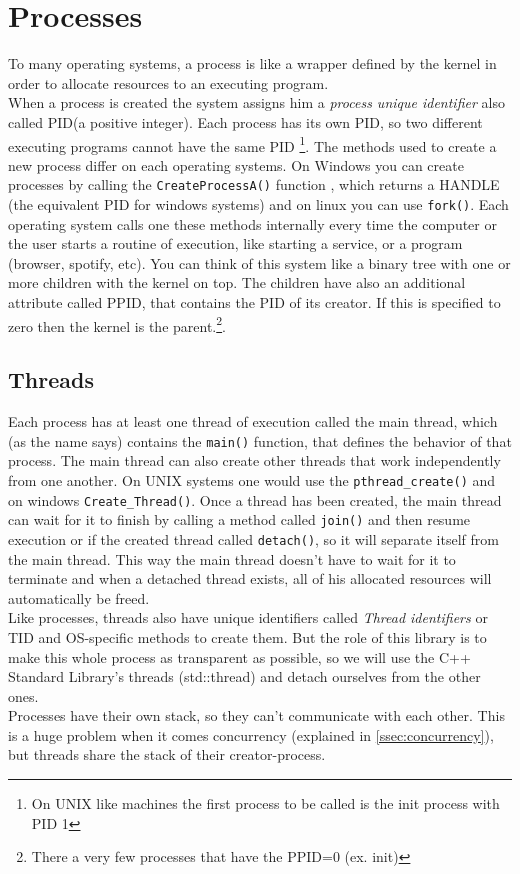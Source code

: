 \section{Processes}
To many operating systems, a process is like a wrapper defined by the kernel in order to allocate resources to an executing program.\\
When a process is created the system assigns him a \textit{process unique identifier} also called PID(a positive integer). Each process has its own PID, so two different executing programs cannot have the same PID \footnote{On UNIX like machines the first process to be called is the init process with PID 1}. The methods used to create a new process differ on each operating systems.
On Windows you can create processes by calling the \texttt{CreateProcessA()} function \cite{createProcWinAPI}, which returns a HANDLE (the equivalent PID for windows systems) and on linux you can use \texttt{fork()}\cite{LPI}. Each operating system calls one these methods internally every time the computer or the user starts a routine of execution, like starting a service, or a program (browser, spotify, etc). You can think of this system like a binary tree with one or more children with the kernel on top. The children have also an additional attribute called PPID, that contains the PID of its creator. If this is specified to zero then the kernel is the parent.\cite{wikiPPID}\footnote{There a very few processes that have the PPID=0 (ex. init)}.
\subsection{Threads} 
Each process has at least one thread of execution called the main thread, which (as the name says) contains the \texttt{main()} function, that defines the behavior of that process. The main thread can also create other threads that work independently from one another. On UNIX systems one would use the \texttt{pthread\_create()} and on windows \texttt{Create\_Thread()}. Once a thread has been created, the main thread can wait for it to finish by calling a method called \texttt{join()} and then resume execution or if the created thread called \texttt{detach()}, so it will separate itself from the main thread. This way the main thread doesn't have to wait for it to terminate and when a detached thread exists, all of his allocated resources will automatically be freed.\\
Like processes, threads also have unique identifiers called \textit{Thread identifiers} or TID and OS-specific methods to create them. But the role of this library is to make this whole process as transparent as possible, so we will use the C++ Standard Library's threads (std::thread) and \dq detach\dq{} ourselves from the other ones.\\
Processes have their own stack, so they can't communicate with each other. This is a huge problem when it comes concurrency (explained in \autoref{ssec:concurrency}), but threads share the stack of their creator-process.
